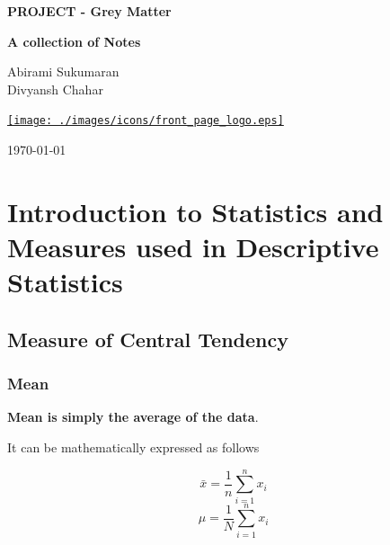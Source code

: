 \documentclass[twoside,12pt]{report}  %
\begin{document}
	\begin{titlepage}
		\begin{center}
			{\LARGE \textbf{PROJECT - Grey Matter}}\\
			
			\hrulefill
			
			\textbf{A collection of Notes}
			
			\null
			
			Abirami Sukumaran \\
			Divyansh Chahar
			
			
			\vfill
			
			\href{https://github.com/divyanshchahar/Grey-Matter}{\texttt{[image: ./images/icons/front\_page\_logo.eps]}}
			
			\null
					
			\vfill
			
			\today
			
		\end{center}
	\end{titlepage}





\printnomenclature


\setcounter{page}{1}

\chapter{Introduction to Statistics and Measures used in Descriptive Statistics}
\section{Measure of Central Tendency}
\noindent
\subsection{Mean}
\begin{tcolorbox}[colback=red!5!white,colframe=red!75!black, title= \textbf{Mean}]
	\textbf{Mean is simply the average of the data}. 
\end{tcolorbox}
\noindent
It can be mathematically expressed as follows

$$\boxed{\bar{x} = \frac{1}{n}\sum_{i=1}^{n}x_i}$$
$$ \boxed{\mu = \frac{1}{N}\sum_{i=1}^{n}x_i} $$
\end{document}
